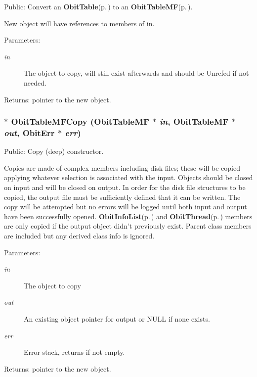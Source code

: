 Public: Convert an {\bf Obit\-Table}{\rm (p.\,\pageref{structObitTable})} to an {\bf Obit\-Table\-MF}{\rm (p.\,\pageref{structObitTableMF})}. 

New object will have references to members of in. \begin{Desc}
\item[Parameters:]
\begin{description}
\item[{\em in}]The object to copy, will still exist afterwards and should be Unrefed if not needed. \end{description}
\end{Desc}
\begin{Desc}
\item[Returns:]pointer to the new object. \end{Desc}
\subsubsection{$\ast$ Obit\-Table\-MFCopy ({\bf Obit\-Table\-MF} $\ast$ {\em in}, {\bf Obit\-Table\-MF} $\ast$ {\em out}, {\bf Obit\-Err} $\ast$ {\em err})}\label{ObitTableMF_8h_a14}


Public: Copy (deep) constructor. 

Copies are made of complex members including disk files; these will be copied applying whatever selection is associated with the input. Objects should be closed on input and will be closed on output. In order for the disk file structures to be copied, the output file must be sufficiently defined that it can be written. The copy will be attempted but no errors will be logged until both input and output have been successfully opened. {\bf Obit\-Info\-List}{\rm (p.\,\pageref{structObitInfoList})} and {\bf Obit\-Thread}{\rm (p.\,\pageref{structObitThread})} members are only copied if the output object didn't previously exist. Parent class members are included but any derived class info is ignored. \begin{Desc}
\item[Parameters:]
\begin{description}
\item[{\em in}]The object to copy \item[{\em out}]An existing object pointer for output or NULL if none exists. \item[{\em err}]Error stack, returns if not empty. \end{description}
\end{Desc}
\begin{Desc}
\item[Returns:]pointer to the new object. \end{Desc}
